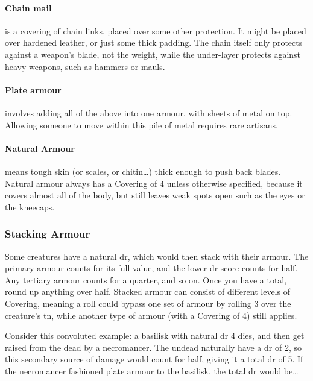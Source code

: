 \begin{multicols}{2}
\paragraph{Chain mail}
is a covering of chain links, placed over some other protection.
It might be placed over hardened leather, or just some thick padding.
The chain itself only protects against a weapon's blade, not the weight, while the under-layer protects against heavy weapons, such as hammers or mauls.

\paragraph{Plate armour}
involves adding all of the above into one armour, with sheets of metal on top.
Allowing someone to move within this pile of metal requires rare artisans.


\paragraph{Natural Armour}
means tough skin (or scales, or chitin\ldots) thick enough to push back blades.
Natural armour always has a Covering of 4 unless otherwise specified, because it covers almost all of the body, but still leaves weak spots open such as the eyes or the kneecaps.

\begin{figure*}[t!]
\projectilesChart
\end{figure*}

\subsubsection{Stacking Armour}
\label{stackingarmour}

Some creatures have a natural \gls{dr}, which would then stack with their armour.
The primary armour counts for its full value, and the lower \gls{dr} score counts for half.
Any tertiary armour counts for a quarter, and so on.
Once you have a total, round up anything over half.
Stacked armour can consist of different levels of Covering, meaning a roll could bypass one set of armour by rolling 3 over the creature's \gls{tn}, while another type of armour (with a Covering of 4) still applies.

Consider this convoluted example: a basilisk with natural \gls{dr} 4 dies, and then get raised from the dead by a necromancer.
The undead naturally have a \gls{dr} of 2, so this secondary source of damage would count for half, giving it a total \gls{dr} of 5.
If the necromancer fashioned plate armour to the basilisk, the total \gls{dr} would be\ldots


\end{multicols}
